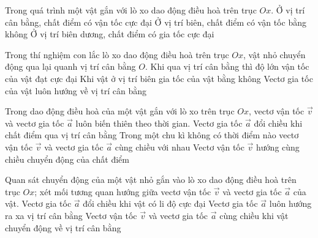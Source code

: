 \setcounter{ex}{0}
\PhanII
\begin{ex}
Trong quá trình một vật gắn với lò xo dao động điều hoà trên trục $Ox$.
{Ở vị trí cân bằng, chất điểm có vận tốc cực đại}
{\True Ở vị trí biên, chất điểm có vận tốc bằng không}
{Ở vị trí biên dương, chất điểm có gia tốc cực đại}
\loigiai{
\begin{itemchoice}
\itemch
\itemch
\itemch
\itemch
\end{itemchoice}
}
\end{ex} 
\begin{ex}
Trong thí nghiệm con lắc lò xo dao động điều hoà trên trục $Ox$, vật nhỏ chuyển động qua lại quanh vị trí cân bằng $O$.
{\True Khi qua vị trí cân bằng thì độ lớn vận tốc của vật đạt cực đại}
{Khi vật ở vị trí biên gia tốc của vật bằng không}
{\True Vectơ gia tốc của vật luôn hướng về vị trí cân bằng}
\loigiai{
\begin{itemchoice}
\itemch
\itemch
\itemch
\itemch
\end{itemchoice}
}
\end{ex} 
\begin{ex}
Trong dao động điều hoà của một vật gắn với lò xo trên trục $Ox$, vectơ vận tốc $\vec{v}$ và vectơ gia tốc $\vec{a}$ luôn biến thiên theo thời gian.
{\True Vectơ gia tốc $\vec{a}$ đổi chiều khi chất điểm qua vị trí cân bằng}
{Trong một chu kì không có thời điểm nào vectơ vận tốc $\vec{v}$ và vectơ gia tốc $\vec{a}$ cùng chiều với nhau}
{\True Vectơ vận tốc $\vec{v}$ hướng cùng chiều chuyển động của chất điểm}
\loigiai{
\begin{itemchoice}
\itemch
\itemch
\itemch
\itemch
\end{itemchoice}
}
\end{ex} 
\begin{ex}
Quan sát chuyển động của một vật nhỏ gắn vào lò xo dao động điều hoà trên trục $Ox$; xét mối tương quan hướng giữa vectơ vận tốc $\vec v$ và vectơ gia tốc $\vec a$ của vật.
{Vectơ gia tốc $\vec a$ đổi chiều khi vật có li độ cực đại}
{Vectơ gia tốc $\vec a$ luôn hướng ra xa vị trí cân bằng}
{\True Vectơ vận tốc $\vec v$ và vectơ gia tốc $\vec a$ cùng chiều khi vật chuyển động về vị trí cân bằng}
\end{ex}

 

